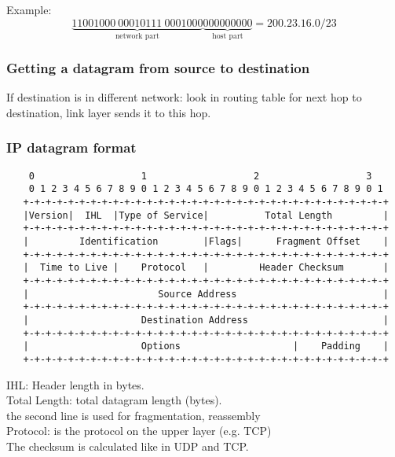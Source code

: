\documentclass[10pt, a4paper, twocolumn]{scrartcl}
\begin{document}
Example: 
\begin{displaymath}
	\underbrace{11001000\:00010111\:0001000}_{\mbox{network part}}\underbrace{000000000}_{\mbox{host part}} = 200.23.16.0/23
\end{displaymath}

\subsubsection{Getting a datagram from source to destination}

If destination is in different network: look in routing table for next hop to destination, link layer sends it to this hop.

\subsubsection{IP datagram format}

\scriptsize
\begin{verbatim}
    0                   1                   2                   3   
    0 1 2 3 4 5 6 7 8 9 0 1 2 3 4 5 6 7 8 9 0 1 2 3 4 5 6 7 8 9 0 1 
   +-+-+-+-+-+-+-+-+-+-+-+-+-+-+-+-+-+-+-+-+-+-+-+-+-+-+-+-+-+-+-+-+
   |Version|  IHL  |Type of Service|          Total Length         |
   +-+-+-+-+-+-+-+-+-+-+-+-+-+-+-+-+-+-+-+-+-+-+-+-+-+-+-+-+-+-+-+-+
   |         Identification        |Flags|      Fragment Offset    |
   +-+-+-+-+-+-+-+-+-+-+-+-+-+-+-+-+-+-+-+-+-+-+-+-+-+-+-+-+-+-+-+-+
   |  Time to Live |    Protocol   |         Header Checksum       |
   +-+-+-+-+-+-+-+-+-+-+-+-+-+-+-+-+-+-+-+-+-+-+-+-+-+-+-+-+-+-+-+-+
   |                       Source Address                          |
   +-+-+-+-+-+-+-+-+-+-+-+-+-+-+-+-+-+-+-+-+-+-+-+-+-+-+-+-+-+-+-+-+
   |                    Destination Address                        |
   +-+-+-+-+-+-+-+-+-+-+-+-+-+-+-+-+-+-+-+-+-+-+-+-+-+-+-+-+-+-+-+-+
   |                    Options                    |    Padding    |
   +-+-+-+-+-+-+-+-+-+-+-+-+-+-+-+-+-+-+-+-+-+-+-+-+-+-+-+-+-+-+-+-+
\end{verbatim}
\normalsize

IHL: Header length in bytes.\\
Total Length: total datagram length (bytes).\\
the second line is used for fragmentation, reassembly\\
Protocol: is the protocol on the upper layer (e.g. TCP)\\
The checksum is calculated like in UDP and TCP.
\end{document}
